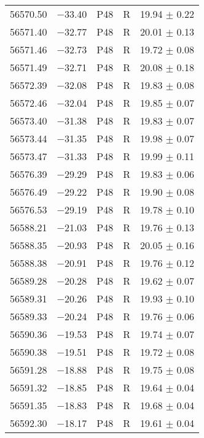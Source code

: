 \begin{tabular}{crccc}
    56570.50  &$-$33.40  &       P48  &   R  &     19.94 $\pm$ 0.22 \\
    56571.40  &$-$32.77  &       P48  &   R  &     20.01 $\pm$ 0.13 \\
    56571.46  &$-$32.73  &       P48  &   R  &     19.72 $\pm$ 0.08 \\
    56571.49  &$-$32.71  &       P48  &   R  &     20.08 $\pm$ 0.18 \\
    56572.39  &$-$32.08  &       P48  &   R  &     19.83 $\pm$ 0.08 \\
    56572.46  &$-$32.04  &       P48  &   R  &     19.85 $\pm$ 0.07 \\
    56573.40  &$-$31.38  &       P48  &   R  &     19.83 $\pm$ 0.07 \\
    56573.44  &$-$31.35  &       P48  &   R  &     19.98 $\pm$ 0.07 \\
    56573.47  &$-$31.33  &       P48  &   R  &     19.99 $\pm$ 0.11 \\
    56576.39  &$-$29.29  &       P48  &   R  &     19.83 $\pm$ 0.06 \\
    56576.49  &$-$29.22  &       P48  &   R  &     19.90 $\pm$ 0.08 \\
    56576.53  &$-$29.19  &       P48  &   R  &     19.78 $\pm$ 0.10 \\
    56588.21  &$-$21.03  &       P48  &   R  &     19.76 $\pm$ 0.13 \\
    56588.35  &$-$20.93  &       P48  &   R  &     20.05 $\pm$ 0.16 \\
    56588.38  &$-$20.91  &       P48  &   R  &     19.76 $\pm$ 0.12 \\
    56589.28  &$-$20.28  &       P48  &   R  &     19.62 $\pm$ 0.07 \\
    56589.31  &$-$20.26  &       P48  &   R  &     19.93 $\pm$ 0.10 \\
    56589.33  &$-$20.24  &       P48  &   R  &     19.76 $\pm$ 0.06 \\
    56590.36  &$-$19.53  &       P48  &   R  &     19.74 $\pm$ 0.07 \\
    56590.38  &$-$19.51  &       P48  &   R  &     19.72 $\pm$ 0.08 \\
    56591.28  &$-$18.88  &       P48  &   R  &     19.75 $\pm$ 0.08 \\
    56591.32  &$-$18.85  &       P48  &   R  &     19.64 $\pm$ 0.04 \\
    56591.35  &$-$18.83  &       P48  &   R  &     19.68 $\pm$ 0.04 \\
    56592.30  &$-$18.17  &       P48  &   R  &     19.61 $\pm$ 0.04 \\

\end{tabular}
